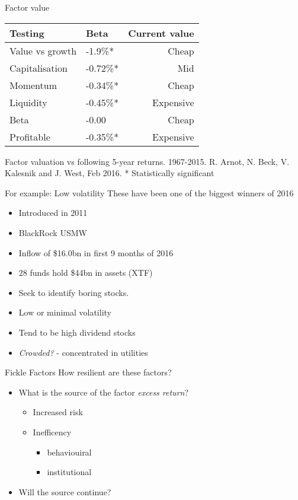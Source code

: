\documentclass[14pt,xcolor=pdftex,dvipsnames,table]{beamer}\usepackage[]{graphicx}\usepackage[]{color}
\begin{document}
\begin{frame}{Factor value}
\begin{table}
\begin{center}
\begin{tabular}{l  p{2cm} r}
\textbf{Testing} & \textbf{Beta} & \textbf{Current value}\\
\hline
Value vs growth & -1.9\%* & Cheap\\
Capitalisation & -0.72\%* & Mid\\
Momentum & -0.34\%* & Cheap\\
Liquidity & -0.45\%* & Expensive\\ 
Beta & -0.00 & Cheap\\
Profitable & -0.35\%* & Expensive\\
\end{tabular}
\end{center}
\end{table}
Factor valuation vs following 5-year returns.  1967-2015.  R. Arnot, N. Beck, V. Kalesnik and J. West, Feb 2016.  
* Statistically significant
\end{frame}

\begin{frame}{For example: Low volatility}
These have been one of the biggest winners of 2016
\begin{itemize}[<+-| alert@+>]
\pause
\item Introduced in 2011
\item BlackRock USMW 
\item Inflow of \$16.0bn in first 9 months of 2016
\item 28 funds hold \$44bn in assets (XTF)
\item Seek to identify boring stocks.  
\item Low or minimal volatility
\item Tend to be high dividend stocks
\item \emph{Crowded?} - concentrated in utilities
\end{itemize}
\end{frame}


\begin{frame}{Fickle Factors}
How resilient are these factors? 
\begin{itemize}[<+-| alert@+>]
\pause
\item What is the source of the factor \emph{excess return}?
\begin{itemize}
\item Increased risk
\item Inefficency
\begin{itemize}
\item behaviouiral
\item institutional
\end{itemize}
\end{itemize}
\item Will the source continue? 
\end{itemize}
\end{frame}
\end{document}
